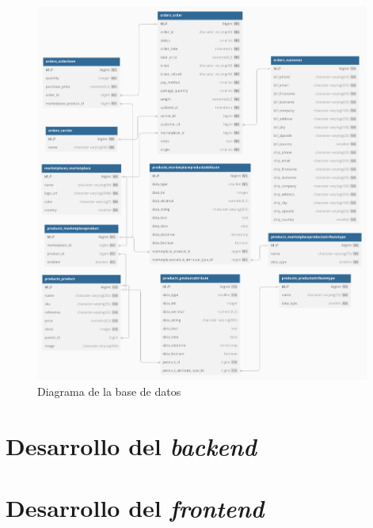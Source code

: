 \begin{figure}
    \centering
    \includegraphics[width=0.98\textwidth]{figures/design_develop/database_diagram.pdf}
    \caption{Diagrama de la base de datos}
    \label{fig:diagrama_base_datos}
\end{figure}

\section{Desarrollo del \textit{backend}}


\section{Desarrollo del \textit{frontend}}